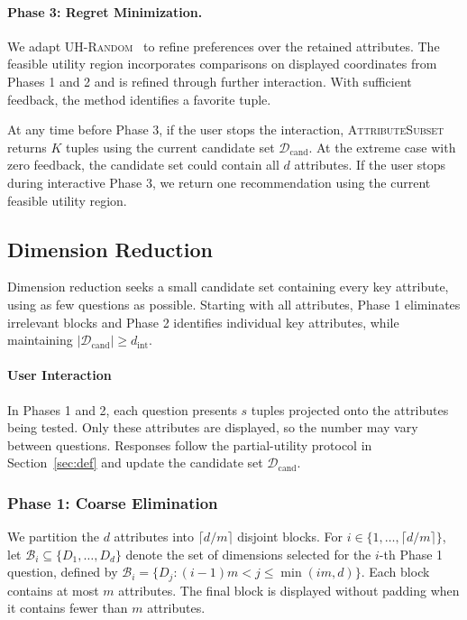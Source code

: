 \documentclass[conference]{IEEEtran}
\theoremstyle{definition}
\theoremstyle{plain}
\begin{document}
\paragraph{Phase 3: Regret Minimization.}
We adapt \textsc{UH-Random}~\cite{XCL19} to refine preferences over the retained attributes. The feasible utility region incorporates comparisons on displayed coordinates from Phases 1 and 2 and is refined through further interaction. With sufficient feedback, the method identifies a favorite tuple.

At any time before Phase 3, if the user stops the interaction, \textsc{AttributeSubset} returns $K$ tuples using the current candidate set $\mathcal{D}_\text{cand}$. At the extreme case with zero feedback, the candidate set could contain all $d$ attributes. If the user stops during interactive Phase 3, we return one recommendation using the current feasible utility region.

\subsection{Dimension Reduction}
\label{subsec:dimR}

Dimension reduction seeks a small candidate set containing every key attribute, using as few questions as possible. Starting with all attributes, Phase 1 eliminates irrelevant blocks and Phase 2 identifies individual key attributes, while maintaining $\lvert\mathcal{D}_\text{cand}\rvert\geq d_\text{int}$.

\paragraph{\textbf{User Interaction}} 
In Phases 1 and 2, each question presents $s$ tuples projected onto the attributes being tested. Only these attributes are displayed, so the number may vary between questions. Responses follow the partial-utility protocol in Section~\ref{sec:def} and update the candidate set $\mathcal{D}_\text{cand}$.

\subsubsection{\textbf{Phase 1: Coarse Elimination}}

We partition the $d$ attributes into $\lceil d/m\rceil$ disjoint blocks. For $i\in\{1,\ldots,\lceil d/m\rceil\}$, let $\mathcal{B}_i\subseteq\{D_1,\ldots,D_d\}$ denote the set of dimensions selected for the $i$-th Phase 1 question, defined by $\mathcal{B}_i=\{D_j:(i-1)m<j\leq\min(im,d)\}$. Each block contains at most $m$ attributes. The final block is displayed without padding when it contains fewer than $m$ attributes.
\end{document}
